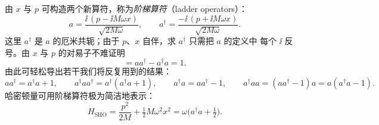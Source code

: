 由 $x$ 与 $p$ 可构造两个新算符，称为\emph{阶梯算符}（ladder operators）：
\begin{equation}
a=\frac{\ii\,(p-\ii M\omega x)}{\sqrt{2M\omega}},
\qquad
a^{\dagger}=\frac{-\ii\,(p+\ii M\omega x)}{\sqrt{2M\omega}}.
\tag{ladder}
\end{equation}
这里 $a^{\dagger}$ 是 $a$ 的厄米共轭；由于 $p$、$x$ 自伴，求 $a^{\dagger}$ 只需把 $a$ 的定义中
每个 $\ii$ 反号。由 $x$ 与 $p$ 的对易子不难证明
\begin{equation*}
[a,a^{\dagger}]=aa^{\dagger}-a^{\dagger}a=1 .
\end{equation*}
由此可轻松导出若干我们将反复用到的结果：
\begin{equation*}
aa^{\dagger}=a^{\dagger}a+1,\qquad
a^{\dagger}aa^{\dagger}=a^{\dagger}(a^{\dagger}a+1),\qquad
a^{\dagger}a=aa^{\dagger}-1,\qquad
a^{\dagger}aa=(aa^{\dagger}-1)a=a(a^{\dagger}a-1).
\end{equation*}
哈密顿量可用阶梯算符极为简洁地表示：
\begin{equation*}
H_{\text{SHO}}=\frac{p^{2}}{2M}+\tfrac12 M\omega^{2}x^{2}=\omega\bigl(a^{\dagger}a+\tfrac12\bigr).
\end{equation*}

